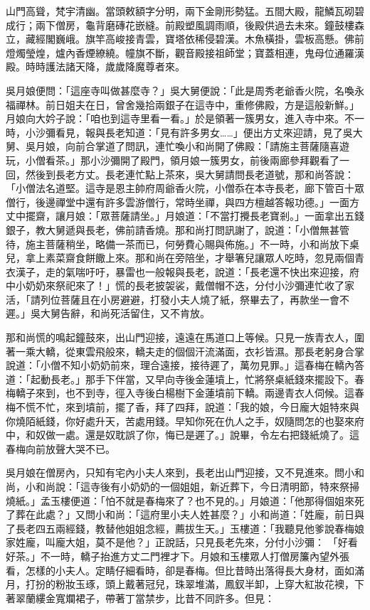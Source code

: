 山門高聳，梵宇清幽。當頭敕額字分明，兩下金剛形勢猛。五間大殿，龍鱗瓦砌碧成行；兩下僧房，龜背磨磚花嵌縫。前殿塑風調雨順，後殿供過去未來。鐘鼓樓森立，藏經閣巍峨。旗竿高峻接青雲，寶塔依稀侵碧漢。木魚橫掛，雲板高懸。佛前燈燭瑩煌，爐內香煙繚繞。幢旗不斷，觀音殿接祖師堂；寶蓋相連，鬼母位通羅漢殿。時時護法諸天降，歲歲降魔尊者來。

吳月娘便問：「這座寺叫做甚麼寺？」吳大舅便說：「此是周秀老爺香火院，名喚永福禪林。前日姐夫在日，曾舍幾拾兩銀子在這寺中，重修佛殿，方是這般新鮮。」月娘向大妗子說：「咱也到這寺里看一看。」於是領著一簇男女，進入寺中來。不一時，小沙彌看見，報與長老知道：「見有許多男女……」便出方丈來迎請，見了吳大舅、吳月娘，向前合掌道了問訊，連忙喚小和尚開了佛殿：「請施主菩薩隨喜遊玩，小僧看茶。」那小沙彌開了殿門，領月娘一簇男女，前後兩廊參拜觀看了一回，然後到長老方丈。長老連忙點上茶來，吳大舅請問長老道號，那和尚答說：「小僧法名道堅。這寺是恩主帥府周爺香火院，小僧忝在本寺長老，廊下管百十眾僧行，後邊禪堂中還有許多雲游僧行，常時坐禪，與四方檀越答報功德。」一面方丈中擺齋，讓月娘：「眾菩薩請坐。」月娘道：「不當打攪長老寶剎。」一面拿出五錢銀子，教大舅遞與長老，佛前請香燒。那和尚打問訊謝了，說道：「小僧無甚管待，施主菩薩稍坐，略備一茶而已，何勞費心賜與佈施。」不一時，小和尚放下桌兒，拿上素菜齋食餅饊上來。那和尚在旁陪坐，才舉箸兒讓眾人吃時，忽見兩個青衣漢子，走的氣喘吁吁，暴雷也一般報與長老，說道：「長老還不快出來迎接，府中小奶奶來祭祀來了！」慌的長老披袈裟，戴僧帽不迭，分付小沙彌連忙收了家活，「請列位菩薩且在小房避避，打發小夫人燒了紙，祭畢去了，再款坐一會不遲。」吳大舅告辭，和尚死活留住，又不肯放。

那和尚慌的鳴起鐘鼓來，出山門迎接，遠遠在馬道口上等候。只見一族青衣人，圍著一乘大轎，從東雲飛般來，轎夫走的個個汗流滿面，衣衫皆濕。那長老躬身合掌說道：「小僧不知小奶奶前來，理合遠接，接待遲了，萬勿見罪。」這春梅在轎內答道：「起動長老。」那手下伴當，又早向寺後金蓮墳上，忙將祭桌紙錢來擺設下。春梅轎子來到，也不到寺，徑入寺後白楊樹下金蓮墳前下轎。兩邊青衣人伺候。這春梅不慌不忙，來到墳前，擺了香，拜了四拜，說道：「我的娘，今日龐大姐特來與你燒陌紙錢，你好處升天，苦處用錢。早知你死在仇人之手，奴隨問怎的也娶來府中，和奴做一處。還是奴耽誤了你，悔已是遲了。」說畢，令左右把錢紙燒了。這春梅向前放聲大哭不已。

吳月娘在僧房內，只知有宅內小夫人來到，長老出山門迎接，又不見進來。問小和尚，小和尚說：「這寺後有小奶奶的一個姐姐，新近葬下，今日清明節，特來祭掃燒紙。」孟玉樓便道：「怕不就是春梅來了？也不見的。」月娘道：「他那得個姐來死了葬在此處？」又問小和尚：「這府里小夫人姓甚麼？」小和尚道：「姓龐，前日與了長老四五兩經錢，教替他姐姐念經，薦拔生天。」玉樓道：「我聽見他爹說春梅娘家姓龐，叫龐大姐，莫不是他？」正說話，只見長老先來，分付小沙彌： 「好看好茶。」不一時，轎子抬進方丈二門裡才下。月娘和玉樓眾人打僧房簾內望外張看，怎樣的小夫人。定睛仔細看時，卻是春梅。但比昔時出落得長大身材，面如滿月，打扮的粉妝玉琢，頭上戴著冠兒，珠翠堆滿，鳳釵半卸，上穿大紅妝花襖，下著翠蘭縷金寬斕裙子，帶著丁當禁步，比昔不同許多。但見：

